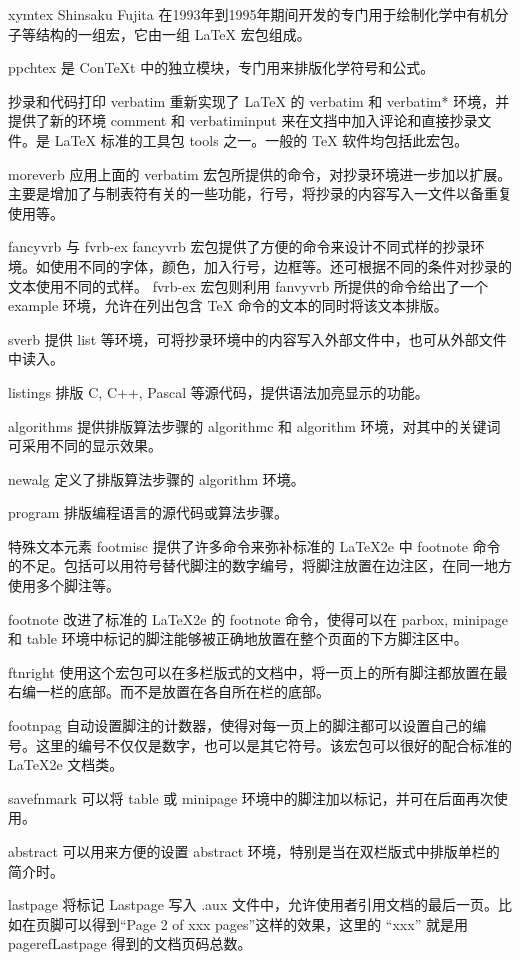 xymtex
Shinsaku Fujita 在1993年到1995年期间开发的专门用于绘制化学中有机分子等结构的一组宏，它由一组 LaTeX 宏包组成。
 
ppchtex
是 ConTeXt 中的独立模块，专门用来排版化学符号和公式。
 
抄录和代码打印 
verbatim
重新实现了 LaTeX 的 verbatim 和 verbatim* 环境，并提供了新的环境 comment 和 verbatiminput 来在文挡中加入评论和直接抄录文件。是 LaTeX 标准的工具包 tools 之一。一般的 TeX 软件均包括此宏包。
 
moreverb
应用上面的 verbatim 宏包所提供的命令，对抄录环境进一步加以扩展。主要是增加了与制表符有关的一些功能，行号，将抄录的内容写入一文件以备重复使用等。
 
fancyvrb 与 fvrb-ex
fancyvrb 宏包提供了方便的命令来设计不同式样的抄录环境。如使用不同的字体，颜色，加入行号，边框等。还可根据不同的条件对抄录的文本使用不同的式样。 fvrb-ex 宏包则利用 fanvyvrb 所提供的命令给出了一个 example 环境，允许在列出包含 TeX 命令的文本的同时将该文本排版。
 
sverb
提供 list 等环境，可将抄录环境中的内容写入外部文件中，也可从外部文件中读入。
 
listings
排版 C, C++, Pascal 等源代码，提供语法加亮显示的功能。
 
algorithms
提供排版算法步骤的 algorithmc 和 algorithm 环境，对其中的关键词可采用不同的显示效果。
 
newalg
定义了排版算法步骤的 algorithm 环境。
 
program
排版编程语言的源代码或算法步骤。
 
特殊文本元素
footmisc
提供了许多命令来弥补标准的 LaTeX2e 中 footnote 命令的不足。包括可以用符号替代脚注的数字编号，将脚注放置在边注区，在同一地方使用多个脚注等。
 
footnote
改进了标准的 LaTeX2e 的 footnote 命令，使得可以在 parbox, minipage 和 table 环境中标记的脚注能够被正确地放置在整个页面的下方脚注区中。
 
ftnright
使用这个宏包可以在多栏版式的文档中，将一页上的所有脚注都放置在最右编一栏的底部。而不是放置在各自所在栏的底部。
 
footnpag
自动设置脚注的计数器，使得对每一页上的脚注都可以设置自己的编号。这里的编号不仅仅是数字，也可以是其它符号。该宏包可以很好的配合标准的 LaTeX2e 文档类。
 
savefnmark
可以将 table 或 minipage 环境中的脚注加以标记，并可在后面再次使用。
 
abstract
可以用来方便的设置 abstract 环境，特别是当在双栏版式中排版单栏的简介时。
 
lastpage
将标记 Lastpage 写入 .aux 文件中，允许使用者引用文档的最后一页。比如在页脚可以得到“Page 2 of xxx pages”这样的效果，这里的 “xxx” 就是用 pageref{Lastpage} 得到的文档页码总数。
 
